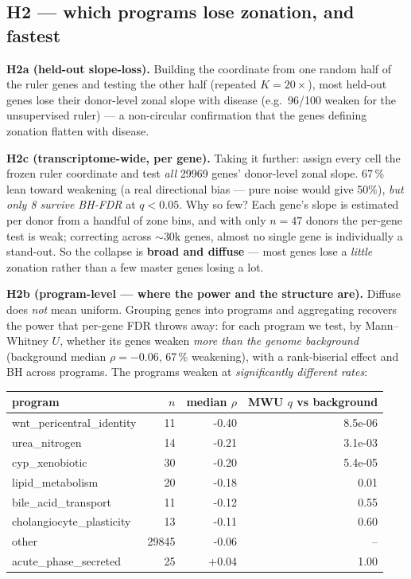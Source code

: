 \documentclass[11pt]{article}
\begin{document}
\subsection{H2 --- which programs lose zonation, and fastest}
\textbf{H2a (held-out slope-loss).} Building the coordinate from one random half of the ruler genes
and testing the other half (repeated $K{=}20\times$), most held-out genes lose their donor-level
zonal slope with disease (e.g.\ 96/100 weaken for the unsupervised ruler) --- a non-circular
confirmation that the genes defining zonation flatten with disease.

\textbf{H2c (transcriptome-wide, per gene).} Taking it further: assign every cell the frozen ruler
coordinate and test \emph{all} 29969 genes' donor-level zonal slope. 67\,\% lean toward
weakening (a real directional bias --- pure noise would give 50\%), \emph{but only 8 survive
BH-FDR} at $q<0.05$. Why so few? Each gene's slope is estimated per donor from a handful of zone
bins, and with only $n{=}47$ donors the per-gene test is weak; correcting across $\sim$30k genes,
almost no single gene is individually a stand-out. So the collapse is \textbf{broad and diffuse} ---
most genes lose a \emph{little} zonation rather than a few master genes losing a lot.

\textbf{H2b (program-level --- where the power and the structure are).} Diffuse does \emph{not} mean
uniform. Grouping genes into programs and aggregating recovers the power that per-gene FDR throws
away: for each program we test, by Mann--Whitney $U$, whether its genes weaken \emph{more than the
genome background} (background median $\rho=-0.06$, 67\,\% weakening), with a rank-biserial
effect and BH across programs. The programs weaken at \emph{significantly different rates}:

\begin{tabular}{l r r r}
\hline
program & $n$ & median $\rho$ & MWU $q$ vs background \\
\hline
wnt\_pericentral\_identity & 11 & -0.40 & 8.5e-06 \\
urea\_nitrogen & 14 & -0.21 & 3.1e-03 \\
cyp\_xenobiotic & 30 & -0.20 & 5.4e-05 \\
lipid\_metabolism & 20 & -0.18 & 0.01 \\
bile\_acid\_transport & 11 & -0.12 & 0.55 \\
cholangiocyte\_plasticity & 13 & -0.11 & 0.60 \\
other & 29845 & -0.06 & -- \\
acute\_phase\_secreted & 25 & +0.04 & 1.00 \\
\hline
\end{tabular}
\end{document}
